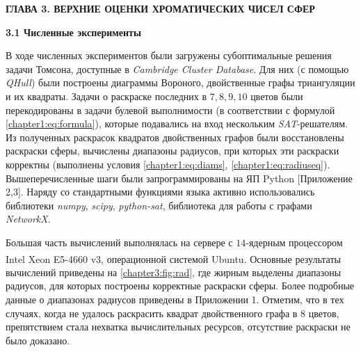 \newpage
\begin{center}
\noindent\textbf{ГЛАВА 3. ВЕРХНИЕ ОЦЕНКИ ХРОМАТИЧЕСКИХ ЧИСЕЛ СФЕР}\label{chapters:3}
\vspace{1.5mm}
\end{center}

\vspace{5pt}
\textbf{3.1 Численные эксперименты}\label{chapters:3.1}
\vspace{5pt}

В ходе численных экспериментов были загружены субоптимальные решения задачи Томсона, 
доступные в \textit{Cambridge Cluster Database}. 
Для них (с помощью \textit{QHull}) были построены диаграммы Вороного, двойственные графы триангуляции и их квадраты.  
Задачи о раскраске последних в $7,8,9,10$ цветов были перекодированы в задачи булевой выполнимости (в соответствии с 
формулой \ref{chapter1:eq:formula}), которые подавались на вход нескольким \textit{SAT}-решателям. 
Из полученных раскрасок квадратов двойственных графов были восстановлены раскраски сферы, вычислены диапазоны радиусов, 
при которых эти раскраски корректны (выполнены условия \ref{chapter1:eq:diams}, \ref{chapter1:eq:radiuseq}). 
Вышеперечисленные шаги были запрограммированы на ЯП Python [Приложение 2,3]. 
Наряду со стандартными функциями языка активно использовались библиотеки \textit{numpy}, \textit{scipy}, \textit{python-sat},  
библиотека для работы с графами \textit{NetworkX}.

Большая часть вычислений выполнялась на сервере с
$14$-ядерным процессором Intel\textsuperscript{\textcopyright} Xeon\textsuperscript{\textcopyright} E5-4660 v3, 
операционной системой Ubuntu. 
Основные результаты вычислений приведены на \figurename{ \ref{chapter3:fig:rad}}, где жирным выделены диапазоны радиусов, 
для которых построены корректные раскраски сферы. Более подробные данные о диапазонах радиусов приведены в Приложении 1.
Отметим, что в тех случаях, когда не удалось раскрасить квадрат двойственного графа в $8$ цветов, 
препятствием стала нехватка вычислительных ресурсов, отсутствие раскраски не было доказано.

